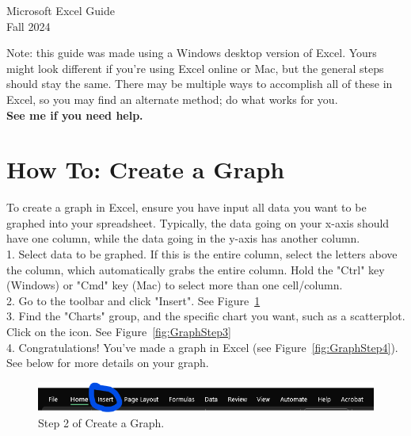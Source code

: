 \documentclass[11pt]{article}
\begin{document}
\begin{center}
\huge{Microsoft Excel Guide}\\ \medskip \Large{Fall 2024}\\ 
\end{center}

Note: this guide was made using a Windows desktop version of Excel. Yours might look different if you're using Excel online or Mac, but the general steps should stay the same. There may be multiple ways to accomplish all of these in Excel, so you may find an alternate method; do what works for you. \\

\textbf{See me if you need help.} \\


\section{How To: Create a Graph}

To create a graph in Excel, ensure you have input all data you want to be graphed into your spreadsheet. Typically, the data going on your x-axis should have one column, while the data going in the y-axis has another column. \\

1. Select data to be graphed. If this is the entire column, select the letters above the column, which automatically grabs the entire column. Hold the "Ctrl" key (Windows) or "Cmd" key (Mac) to select more than one cell/column. \\

2. Go to the toolbar and click "Insert". See Figure~\ref{fig:GraphStep2} \\

3. Find the "Charts" group, and the specific chart you want, such as a scatterplot. Click on the icon. See Figure~\ref{fig:GraphStep3} \\

4. Congratulations! You've made a graph in Excel (see Figure~\ref{fig:GraphStep4}). See below for more details on your graph.

\begin{figure}
    \centering
    \includegraphics[width=\linewidth]{Images/1step2.png}
    \caption{Step 2 of Create a Graph.}
    \label{fig:GraphStep2}
\end{figure}
\end{document}
